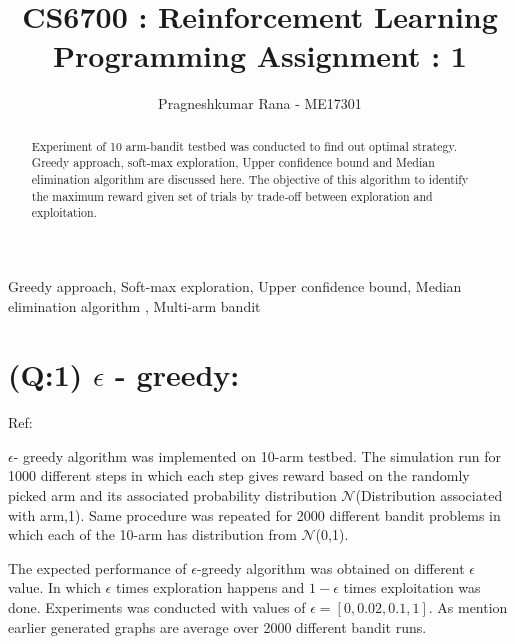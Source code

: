 \documentclass[preprint,12pt]{elsarticle}
\begin{document}
	
	\begin{frontmatter}
		
		
		\title{CS6700 : Reinforcement Learning
			\\Programming Assignment : 1}	
		\author{Pragneshkumar Rana - ME17301}

		\address{Indian Institute of Technology, Madras}

		\begin{abstract}
		 Experiment of 10 arm-bandit testbed was conducted to find out optimal strategy. Greedy approach, soft-max exploration, Upper confidence bound and Median elimination algorithm are discussed here. The objective of this algorithm to identify the maximum reward given set of trials by trade-off between exploration and exploitation.  
		\end{abstract}
		
		\begin{keyword}
			Greedy approach, Soft-max exploration, Upper confidence bound, Median elimination algorithm , Multi-arm bandit
			
		\end{keyword}
		
	\end{frontmatter}
	

	
	\section{(Q:1) $\epsilon$ - greedy:}
	\label{S:1}
	Ref: \cite{sutton2018reinforcement} 
	\cite{vidya}
	
	$\epsilon$- greedy algorithm was implemented on 10-arm testbed. The simulation run for 1000 different steps in which each step gives reward based on the randomly picked arm and its associated probability distribution $\mathcal{N}$(Distribution associated with arm,1). Same procedure was repeated for 2000 different bandit problems in which each of the 10-arm has distribution from $\mathcal{N}$(0,1). 
	
	The expected performance of $\epsilon$-greedy algorithm was obtained on different $\epsilon$ value. In which $\epsilon$ times exploration happens and $1-\epsilon$ times exploitation was done. Experiments was conducted with values of $\epsilon=[0,0.02,0.1,1]$. As mention earlier generated graphs are average over 2000 different bandit runs.
	
\end{document}
